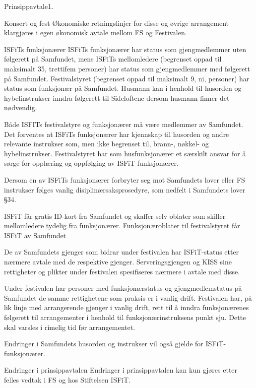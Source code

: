 \begin{instruks}{Prinsippavtale}{1. }{ }
\begin{instruksledd}{Konsert og fest}
Økonomiske retningslinjer for disse og øvrige arrangement klargjøres i egen økonomisk avtale mellom
FS og
Festivalen.
	\end{instruksledd}
	\begin{instruksledd}{ISFiTs funksjonærer} 
ISFiTs funksjonærer har status som gjengmedlemmer uten følgerett på Samfundet, mens ISFiTs
mellomledere
(begrenset oppad til maksimalt 35, trettifem personer) har status som gjengmedlemmer med følgerett
på Samfundet.
Festivalstyret (begrenset oppad til maksimalt 9, ni, personer) har status som funksjonær på
Samfundet. Husmann kan i
henhold til husorden og hybelinstrukser inndra følgerett til Sideloftene dersom husmann finner det
nødvendig.

Både ISFITs festivalstyre og funksjonærer må være medlemmer av Samfundet. Det forventes at ISFiTs
funksjonærer
har kjennskap til husorden og andre relevante instrukser som, men ikke begrenset til, brann-,
nøkkel- og
hybelinstrukser. Festivalstyret har som husfunksjonærer et særskilt ansvar for å sørge for opplæring
og oppfølging av
ISFiT-funksjonærer.

Dersom en av ISFiTs funksjonærer forbryter seg mot Samfundets lover eller FS instrukser følges
vanlig
disiplinærsaksprosedyre, som nedfelt i Samfundets lover §34.

ISFiT får gratis ID-kort fra Samfundet og skaffer selv oblater som skiller mellomledere tydelig fra
funksjonærer.
Funksjonæroblater til festivalstyret får ISFiT av Samfundet

De av Samfundets gjenger som bidrar under festivalen har ISFiT-status etter nærmere avtale med de
respektive
gjenger. Serveringsgjengen og KISS sine rettigheter og plikter under festivalen spesifiseres nærmere
i avtale med
disse.

Under festivalen har personer med funksjonærstatus og gjengmedlemstatus på Samfundet de samme
rettighetene som
praksis er i vanlig drift. Festivalen har, på lik linje med arrangerende gjenger i vanlig drift,
rett til å inndra
funksjonærenes følgerett til arrangementer i henhold til funksjonærinstruksens punkt sju. Dette skal
varsles i rimelig
tid før arrangementet.

Endringer i Samfundets husorden og instrukser vil også gjelde for ISFiT-funksjonærer.

	\end{instruksledd}

	\begin{instruksledd}{Endringer i prinsippavtalen}
Endringer i prinsippavtalen kan kun gjøres etter felles vedtak i FS og hos Stiftelsen ISFiT.
	\end{instruksledd} 
\end{instruks}


